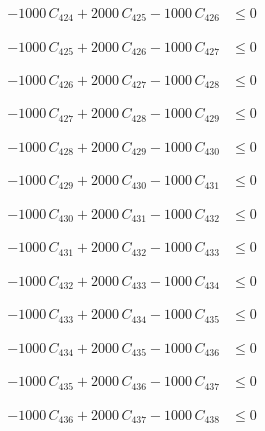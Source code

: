 \documentclass[a4paper,11pt]{article}
\begin{document}
\begin{align}
-1000\,C_{424} + 2000\,C_{425} - 1000\,C_{426} &\leq 0 \nonumber
\end{align}

\begin{align}
-1000\,C_{425} + 2000\,C_{426} - 1000\,C_{427} &\leq 0 \nonumber
\end{align}

\begin{align}
-1000\,C_{426} + 2000\,C_{427} - 1000\,C_{428} &\leq 0 \nonumber
\end{align}

\begin{align}
-1000\,C_{427} + 2000\,C_{428} - 1000\,C_{429} &\leq 0 \nonumber
\end{align}

\begin{align}
-1000\,C_{428} + 2000\,C_{429} - 1000\,C_{430} &\leq 0 \nonumber
\end{align}

\begin{align}
-1000\,C_{429} + 2000\,C_{430} - 1000\,C_{431} &\leq 0 \nonumber
\end{align}

\begin{align}
-1000\,C_{430} + 2000\,C_{431} - 1000\,C_{432} &\leq 0 \nonumber
\end{align}

\begin{align}
-1000\,C_{431} + 2000\,C_{432} - 1000\,C_{433} &\leq 0 \nonumber
\end{align}

\begin{align}
-1000\,C_{432} + 2000\,C_{433} - 1000\,C_{434} &\leq 0 \nonumber
\end{align}

\begin{align}
-1000\,C_{433} + 2000\,C_{434} - 1000\,C_{435} &\leq 0 \nonumber
\end{align}

\begin{align}
-1000\,C_{434} + 2000\,C_{435} - 1000\,C_{436} &\leq 0 \nonumber
\end{align}

\begin{align}
-1000\,C_{435} + 2000\,C_{436} - 1000\,C_{437} &\leq 0 \nonumber
\end{align}

\begin{align}
-1000\,C_{436} + 2000\,C_{437} - 1000\,C_{438} &\leq 0 \nonumber
\end{align}
\end{document}
